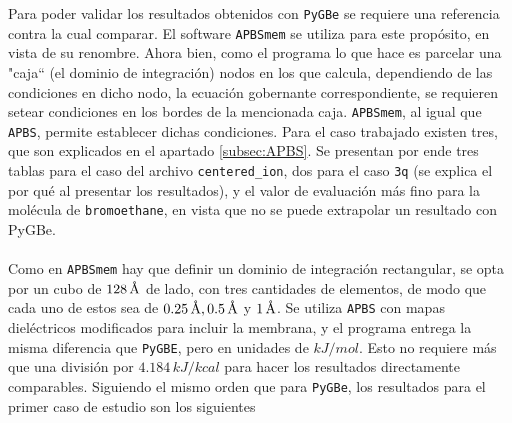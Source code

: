 \documentclass[12pt, oneside, numbers, spanish]{ezthesis}
\numberwithin{equation}{section}
\newcommand{\angstrom}{\text{\normalfont\AA}}
\begin{document}
Para poder validar los resultados obtenidos con \texttt{PyGBe} se requiere una referencia contra la cual comparar. El software \texttt{APBSmem} se utiliza para este propósito, en vista de su renombre. Ahora bien, como el programa lo que hace es parcelar una "caja`` (el dominio de integración) nodos en los que calcula, dependiendo de las condiciones en dicho nodo, la ecuación gobernante correspondiente, se requieren setear condiciones en los bordes de la mencionada caja. \texttt{APBSmem}, al igual que \texttt{APBS}, permite establecer dichas condiciones. Para el caso trabajado existen tres, que son explicados en el apartado \ref{subsec:APBS}. Se presentan por ende tres tablas para el caso del archivo \texttt{centered\_ion}, dos para el caso \texttt{3q} (se explica el por qué al presentar los resultados), y el valor de evaluación más fino para la molécula de \texttt{bromoethane}, en vista que no se puede extrapolar un resultado con PyGBe.\\\\
Como en \texttt{APBSmem} hay que definir un dominio de integración rectangular, se opta por un cubo de $128\,\angstrom$ de lado, con tres cantidades de elementos, de modo que cada uno de estos sea de $0.25\,\angstrom, 0.5\,\angstrom$ y $1\,\angstrom$. Se utiliza \texttt{APBS} con mapas dieléctricos modificados para incluir la membrana, y el programa entrega la misma diferencia que \texttt{PyGBE}, pero en unidades de $kJ/mol$. Esto no requiere más que una división por $4.184\, kJ/kcal$ para hacer los resultados directamente comparables. Siguiendo el mismo orden que para \texttt{PyGBe}, los resultados para el primer caso de estudio son los siguientes
\end{document}
